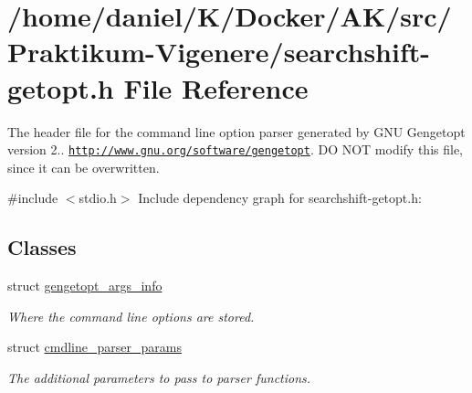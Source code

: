 \hypertarget{searchshift-getopt_8h}{}\section{/home/daniel/\+K/\+Docker/\+A\+K/src/\+Praktikum-\/\+Vigenere/searchshift-\/getopt.h File Reference}
\label{searchshift-getopt_8h}


The header file for the command line option parser generated by G\+NU Gengetopt version 2.. \href{http://www.gnu.org/software/gengetopt}{\tt http\+://www.\+gnu.\+org/software/gengetopt}. DO N\+OT modify this file, since it can be overwritten.  


{\ttfamily \#include $<$stdio.\+h$>$}\newline
Include dependency graph for searchshift-\/getopt.h\+:
\subsection*{Classes}
\begin{DoxyCompactItemize}
\item 
struct \hyperlink{structgengetopt__args__info}{gengetopt\+\_\+args\+\_\+info}
\begin{DoxyCompactList}\small\item\em Where the command line options are stored. \end{DoxyCompactList}\item 
struct \hyperlink{structcmdline__parser__params}{cmdline\+\_\+parser\+\_\+params}
\begin{DoxyCompactList}\small\item\em The additional parameters to pass to parser functions. \end{DoxyCompactList}\end{DoxyCompactItemize}
